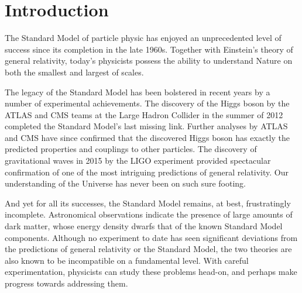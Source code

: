 \chapter{Introduction}
The Standard Model of particle physic has enjoyed an unprecedented level of success since its completion in the late 1960s. Together with Einstein's theory of general relativity, today's physicists possess the ability to understand Nature on both the smallest and largest of scales.

The legacy of the Standard Model has been bolstered in recent years by a number of experimental achievements. The discovery of the Higgs boson by the ATLAS \cite{the_atlas_collaboration_observation_2012} and CMS \cite{the_cms_collaboration_observation_2012} teams at the Large Hadron Collider in the summer of 2012 completed the Standard Model's last missing link. Further analyses by ATLAS and CMS have since confirmed that the discovered Higgs boson has exactly the predicted properties and couplings to other particles. The discovery of gravitational waves in 2015 by the LIGO experiment \cite{ligo_scientific_collaboration_and_virgo_collaboration_observation_2016} provided spectacular confirmation of one of the most intriguing predictions of general relativity. Our understanding of the Universe has never been on such sure footing.

And yet for all its successes, the Standard Model remains, at best, frustratingly incomplete. Astronomical observations indicate the presence of large amounts of dark matter, whose energy density dwarfs that of the known Standard Model components. Although no experiment to date has seen significant deviations from the predictions of general relativity or the Standard Model, the two theories are also known to be incompatible on a fundamental level. With careful experimentation, physicists can study these problems head-on, and perhaps make progress towards addressing them. 

